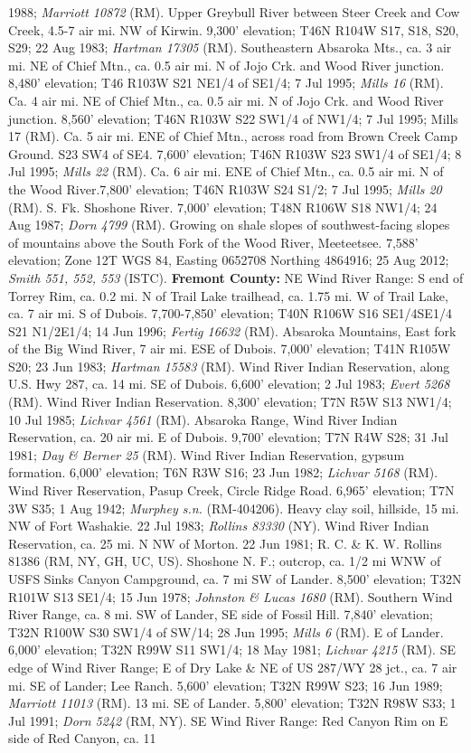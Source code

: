 1988; \textit{Marriott 10872} (RM).  Upper Greybull River between Steer Creek and Cow Creek, 4.5-7 air mi. NW of Kirwin. 9,300’ elevation; T46N R104W S17, S18, S20, S29; 22 Aug 1983; \textit{Hartman 17305} (RM).  Southeastern Absaroka Mts., ca. 3 air mi. NE of Chief Mtn., ca. 0.5 air mi. N of Jojo Crk. and Wood River junction.  8,480’ elevation; T46 R103W S21 NE1/4 of SE1/4; 7 Jul 1995; \textit{Mills 16} (RM).  Ca. 4 air mi. NE of Chief Mtn., ca. 0.5 air mi. N of Jojo Crk. and Wood River junction.  8,560’ elevation; T46N R103W S22 SW1/4 of NW1/4; 7 Jul 1995; Mills 17 (RM).  Ca. 5 air mi. ENE of Chief Mtn., across road from Brown Creek Camp Ground. S23 SW4 of SE4. 7,600’ elevation; T46N R103W S23 SW1/4 of SE1/4; 8 Jul 1995; \textit{Mills 22} (RM).  Ca. 6 air mi. ENE of Chief Mtn., ca. 0.5 air mi. N of the Wood River.7,800’ elevation; T46N R103W S24 S1/2; 7 Jul 1995; \textit{Mills 20} (RM).  S. Fk. Shoshone River.  7,000’ elevation; T48N R106W S18 NW1/4; 24 Aug 1987; \textit{Dorn 4799} (RM).  Growing on shale slopes of southwest-facing slopes of mountains above the South Fork of the Wood River, Meeteetsee.  7,588’ elevation; Zone 12T WGS 84, Easting 0652708 Northing 4864916; 25 Aug 2012; \textit{Smith 551, 552, 553} (ISTC).  \textbf{Fremont County:}  NE Wind River Range: S end of Torrey Rim, ca. 0.2 mi. N of Trail Lake trailhead, ca. 1.75 mi. W of Trail Lake, ca. 7 air mi. S of Dubois. 7,700-7,850' elevation; T40N R106W S16 SE1/4SE1/4 S21 N1/2E1/4; 14 Jun 1996; \textit{Fertig 16632} (RM).  Absaroka Mountains, East fork of the Big Wind River, 7 air mi. ESE of Dubois. 7,000' elevation; T41N R105W S20; 23 Jun 1983; \textit{Hartman 15583} (RM).  Wind River Indian Reservation, along U.S. Hwy 287, ca. 14 mi. SE of Dubois. 6,600' elevation; 2 Jul 1983; \textit{Evert 5268} (RM).  Wind River Indian Reservation. 8,300' elevation; T7N R5W S13 NW1/4; 10 Jul 1985; \textit{Lichvar 4561} (RM).  Absaroka Range, Wind River Indian Reservation, ca. 20 air mi. E of Dubois. 9,700' elevation; T7N R4W S28; 31 Jul 1981; \textit{Day \& Berner 25} (RM).  Wind River Indian Reservation, gypsum formation. 6,000' elevation; T6N R3W S16; 23 Jun 1982; \textit{Lichvar 5168} (RM).  Wind River Reservation, Pasup Creek, Circle Ridge Road. 6,965' elevation; T7N 3W S35; 1 Aug 1942; \textit{Murphey s.n.} (RM-404206).  Heavy clay soil, hillside, 15 mi. NW of Fort Washakie. 22 Jul 1983; \textit{Rollins 83330} (NY).  Wind River Indian Reservation, ca. 25 mi. N NW of Morton.  22 Jun 1981; R. C. \& K. W. Rollins 81386 (RM, NY, GH, UC, US).  Shoshone N. F.; outcrop, ca. 1/2 mi WNW of USFS Sinks Canyon Campground, ca. 7 mi SW of Lander. 8,500' elevation; T32N R101W S13 SE1/4; 15 Jun 1978; \textit{Johnston \& Lucas 1680} (RM).  Southern Wind River Range, ca. 8 mi. SW of Lander, SE side of Fossil Hill. 7,840' elevation; T32N R100W S30 SW1/4 of SW/14; 28 Jun 1995; \textit{Mills 6} (RM).  E of Lander. 6,000' elevation; T32N R99W S11 SW1/4; 18 May 1981; \textit{Lichvar 4215} (RM).  SE edge of Wind River Range; E of Dry Lake \& NE of US 287/WY 28 jct., ca. 7 air mi. SE of Lander; Lee Ranch. 5,600' elevation; T32N R99W S23; 16 Jun 1989; \textit{Marriott 11013} (RM).  13 mi. SE of Lander. 5,800' elevation; T32N R98W S33; 1 Jul 1991; \textit{Dorn 5242} (RM, NY).  SE Wind River Range: Red Canyon Rim on E side of Red Canyon, ca. 11 